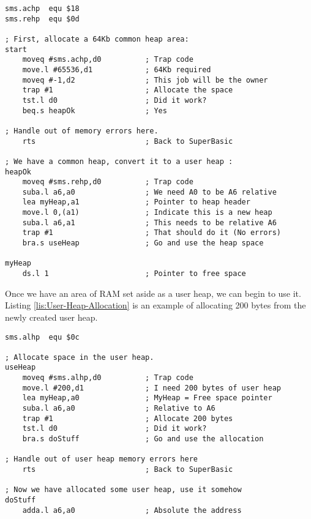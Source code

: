 \begin{lstlisting}[caption={User Heap Creation Example},label={lis:User-Heap-Creation-Example}]
sms.achp  equ $18
sms.rehp  equ $0d

; First, allocate a 64Kb common heap area:
start   
    moveq #sms.achp,d0          ; Trap code
    move.l #65536,d1            ; 64Kb required
    moveq #-1,d2                ; This job will be the owner
    trap #1                     ; Allocate the space
    tst.l d0                    ; Did it work?
    beq.s heapOk                ; Yes

; Handle out of memory errors here.
    rts                         ; Back to SuperBasic
        
; We have a common heap, convert it to a user heap :
heapOk  
    moveq #sms.rehp,d0          ; Trap code
    suba.l a6,a0                ; We need A0 to be A6 relative
    lea myHeap,a1               ; Pointer to heap header
    move.l 0,(a1)               ; Indicate this is a new heap
    suba.l a6,a1                ; This needs to be relative A6
    trap #1                     ; That should do it (No errors)
    bra.s useHeap               ; Go and use the heap space

myHeap
    ds.l 1                      ; Pointer to free space

\end{lstlisting}

Once we have an area of RAM set aside as a user heap, we can begin
to use it. Listing \ref{lis:User-Heap-Allocation} is an example of
allocating 200 bytes from the newly created user heap.

\begin{lstlisting}[caption={User Heap Allocation},label={lis:User-Heap-Allocation}]
sms.alhp  equ $0c

; Allocate space in the user heap.
useHeap
    moveq #sms.alhp,d0          ; Trap code
    move.l #200,d1              ; I need 200 bytes of user heap
    lea myHeap,a0               ; MyHeap = Free space pointer
    suba.l a6,a0                ; Relative to A6        
    trap #1                     ; Allocate 200 bytes
    tst.l d0                    ; Did it work?
    bra.s doStuff               ; Go and use the allocation

; Handle out of user heap memory errors here
    rts                         ; Back to SuperBasic
        
; Now we have allocated some user heap, use it somehow
doStuff 
    adda.l a6,a0                ; Absolute the address

\end{lstlisting}

